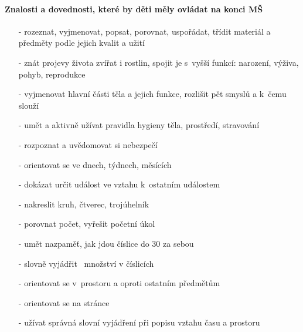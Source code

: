 			\paragraph{Znalosti a dovednosti, které by děti měly ovládat na konci MŠ}
				\begin{itemize}
					\setlength\itemsep{-2mm}
					\item[-] rozeznat, vyjmenovat, popsat, porovnat, uspořádat, třídit materiál a předměty podle jejich kvalit a užití
					\item[-] znát projevy života zvířat i rostlin, spojit je s vyšší funkcí: narození, výživa, pohyb, reprodukce
					\item[-] vyjmenovat hlavní části těla a jejich funkce, rozlišit pět smyslů a k čemu slouží
					\item[-] umět a aktivně užívat pravidla hygieny těla, prostředí, stravování
					\item[-] rozpoznat a uvědomovat si nebezpečí
					\item[-] orientovat se ve dnech, týdnech, měsících
					\item[-] dokázat určit událost ve vztahu k ostatním událostem
					\item[-] nakreslit kruh, čtverec, trojúhelník
					\item[-] porovnat počet, vyřešit početní úkol
					\item[-] umět nazpaměť, jak jdou číslice do 30 za sebou 
					\item[-] slovně vyjádřit  množství v číslicích 
					\item[-] orientovat se v prostoru a oproti ostatním předmětům
					\item[-] orientovat se na stránce
					\item[-] užívat správná slovní vyjádření při popisu vztahu času a prostoru
				\end{itemize}

